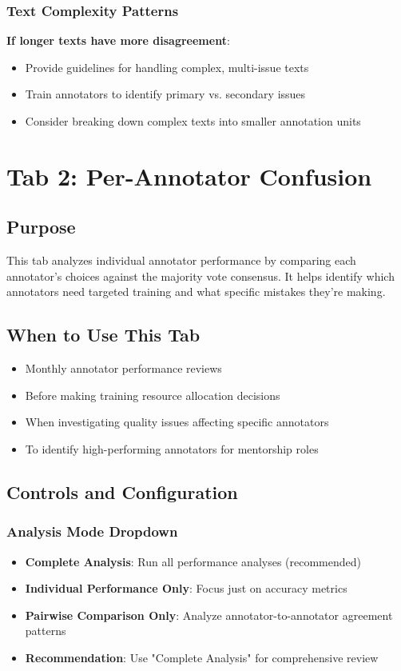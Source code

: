 \documentclass[11pt]{article}
\begin{document}
\subsubsection{Text Complexity Patterns}
\textbf{If longer texts have more disagreement}:
\begin{itemize}
\item Provide guidelines for handling complex, multi-issue texts
\item Train annotators to identify primary vs. secondary issues
\item Consider breaking down complex texts into smaller annotation units
\end{itemize}

\section{Tab 2: Per-Annotator Confusion}

\subsection{Purpose}
This tab analyzes individual annotator performance by comparing each annotator's choices against the majority vote consensus. It helps identify which annotators need targeted training and what specific mistakes they're making.

\subsection{When to Use This Tab}
\begin{itemize}
\item Monthly annotator performance reviews
\item Before making training resource allocation decisions
\item When investigating quality issues affecting specific annotators
\item To identify high-performing annotators for mentorship roles
\end{itemize}

\subsection{Controls and Configuration}

\subsubsection{Analysis Mode Dropdown}
\begin{itemize}
\item \textbf{Complete Analysis}: Run all performance analyses (recommended)
\item \textbf{Individual Performance Only}: Focus just on accuracy metrics
\item \textbf{Pairwise Comparison Only}: Analyze annotator-to-annotator agreement patterns
\item \textbf{Recommendation}: Use "Complete Analysis" for comprehensive review
\end{itemize}
\end{document}
